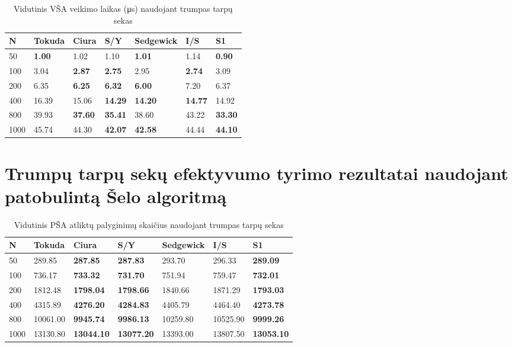 \documentclass{VUMIFInfKursinis}
\begin{document}
\begin{table}[H]
  \caption{Vidutinis VŠA veikimo laikas (μs) naudojant trumpas tarpų sekas}
  \label{tss_small_runtimes}
  \begin{tabular}{|l|l|l|l|l|l|l|}
  \hline
  N    & Tokuda        & Ciura          & S/Y            & Sedgewick      & I/S            & S1             \\ \hline
  50   & \textbf{1.00} & 1.02           & 1.10           & \textbf{1.01}  & 1.14           & \textbf{0.90}  \\ \hline
  100  & 3.04          & \textbf{2.87}  & \textbf{2.75}  & 2.95           & \textbf{2.74}  & 3.09           \\ \hline
  200  & 6.35          & \textbf{6.25}  & \textbf{6.32}  & \textbf{6.00}  & 7.20           & 6.37           \\ \hline
  400  & 16.39         & 15.06          & \textbf{14.29} & \textbf{14.20} & \textbf{14.77} & 14.92          \\ \hline
  800  & 39.93         & \textbf{37.60} & \textbf{35.41} & 38.60          & 43.22          & \textbf{33.30} \\ \hline
  1000 & 45.74         & 44.30          & \textbf{42.07} & \textbf{42.58} & 44.44          & \textbf{44.10} \\ \hline
  \end{tabular}
  \end{table}

\section{Trumpų tarpų sekų efektyvumo tyrimo rezultatai naudojant patobulintą Šelo algoritmą}

\begin{table}[H]
  \caption{Vidutinis PŠA atliktų palyginimų skaičius naudojant trumpas tarpų sekas}
  \label{iss_small_comparisons}
  \begin{tabular}{|l|l|l|l|l|l|l|}
  \hline
  N    & Tokuda   & Ciura             & S/Y               & Sedgewick & I/S      & S1                \\ \hline
  50   & 289.85   & \textbf{287.85}   & \textbf{287.83}   & 293.70    & 296.33   & \textbf{289.09}   \\ \hline
  100  & 736.17   & \textbf{733.32}   & \textbf{731.70}   & 751.94    & 759.47   & \textbf{732.01}   \\ \hline
  200  & 1812.48  & \textbf{1798.04}  & \textbf{1798.66}  & 1840.66   & 1871.29  & \textbf{1793.03}  \\ \hline
  400  & 4315.89  & \textbf{4276.20}  & \textbf{4284.83}  & 4405.79   & 4464.40  & \textbf{4273.78}  \\ \hline
  800  & 10061.00 & \textbf{9945.74}  & \textbf{9986.13}  & 10259.80  & 10525.90 & \textbf{9999.26}  \\ \hline
  1000 & 13130.80 & \textbf{13044.10} & \textbf{13077.20} & 13393.00  & 13807.50 & \textbf{13053.10} \\ \hline
  \end{tabular}
  \end{table}
\end{document}
